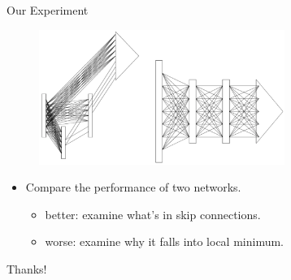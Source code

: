 \documentclass{beamer}
\begin{document}
\begin{frame}
	\begin{block}{Our Experiment}
		\begin{figure}[htbp]
		\centering
		\includegraphics[width = 8cm] {p1.png}
		\end{figure} 
		\begin{itemize}
			\item Compare the performance of two networks.
				\begin{itemize}
				\item better: examine what's in skip connections.
				\item worse: examine why it falls into local minimum.
				\end{itemize}
		\end{itemize}
	\end{block}
\end{frame}

\begin{frame}
	\begin{block}{}
		\centering
		Thanks!
	\end{block}
\end{frame}
\end{document}
